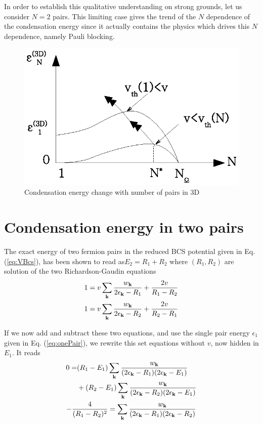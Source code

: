 \documentclass[aps,prb,showpacs,reprint]{revtex4-1}
\begin{document}
In order to establish this qualitative understanding on strong grounds, let us consider $N=2$ pairs. This limiting case gives the trend of the $N$ dependence of the condensation energy since it actually contains the physics which drives this $N$ dependence, namely Pauli blocking.  

\begin{figure}[htb]
	\centering
		\includegraphics[width=0.8\columnwidth]{3dCondChange.eps}
	\caption{Condensation energy change with number of pairs in 3D}
	\label{fig:3dCondChange}
\end{figure}

\section{Condensation energy in two pairs\label{sec:twoPair}}
The exact energy of two fermion pairs in the reduced BCS potential given in Eq. (\ref{eq:VBcs}), has been shown to read as$E_2=R_1+R_2$ where $(R_1,R_2)$ are solution of the two Richardson-Gaudin equations
\begin{equation}
\begin{split}
1&=v\sum_{\mathbf{k}}\frac{w_{\mathbf{k}}}{2\epsilon_{\mathbf{k}}-R_1}+\frac{2v}{R_1-R_2}\\
1&=v\sum_{\mathbf{k}}\frac{w_{\mathbf{k}}}{2\epsilon_{\mathbf{k}}-R_2}+\frac{2v}{R_2-R_1}
\end{split}
\label{eq:richardsonEq}
\end{equation}

If we now add and subtract these two equations, and use the single pair energy $\epsilon_{1}$ given in  Eq. (\ref{eq:onePair}), we rewrite this set equations without $v$, now hidden in $E_{1}$.  It reads 
\begin{gather}
\begin{split}
0=&(R_1-E_1)\sum_{\mathbf{k}}\frac{w_{\mathbf{k}}}{(2\epsilon_{\mathbf{k}}-R_1)(2\epsilon_{\mathbf{k}}-E_1)}\\
&+(R_2-E_1)\sum_{\mathbf{k}}\frac{w_{\mathbf{k}}}{(2\epsilon_{\mathbf{k}}-R_2)(2\epsilon_{\mathbf{k}}-E_1)}\label{eq:2PairPlus}
\end{split}\\
-\frac{4}{(R_1-R_2)^2}=\sum_{\mathbf{k}}\frac{w_{\mathbf{k}}}{(2\epsilon_{\mathbf{k}}-R_1)(2\epsilon_{\mathbf{k}}-R_2)}\label{eq:2PairMinus}
\end{gather}
\end{document}
